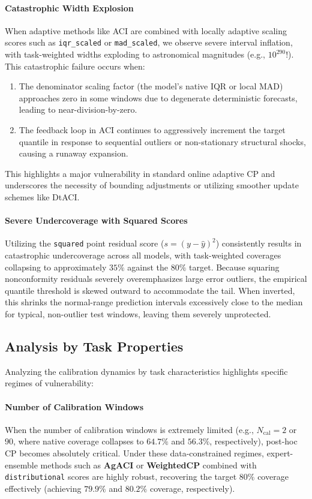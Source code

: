 \documentclass[12pt, a4paper]{article}
\begin{document}
\paragraph{Catastrophic Width Explosion}
When adaptive methods like ACI are combined with locally adaptive scaling scores such as \texttt{iqr\_scaled} or \texttt{mad\_scaled}, we observe severe interval inflation, with task-weighted widths exploding to astronomical magnitudes (e.g., \(10^{290}\)!). This catastrophic failure occurs when:
\begin{enumerate}
	\item The denominator scaling factor (the model's native IQR or local MAD) approaches zero in some windows due to degenerate deterministic forecasts, leading to near-division-by-zero.
	\item The feedback loop in ACI continues to aggressively increment the target quantile in response to sequential outliers or non-stationary structural shocks, causing a runaway expansion.
\end{enumerate}
This highlights a major vulnerability in standard online adaptive CP and underscores the necessity of bounding adjustments or utilizing smoother update schemes like DtACI.

\paragraph{Severe Undercoverage with Squared Scores}
Utilizing the \texttt{squared} point residual score (\(s = (y - \hat{y})^2\)) consistently results in catastrophic undercoverage across all models, with task-weighted coverages collapsing to approximately \(35\%\) against the \(80\%\) target. Because squaring nonconformity residuals severely overemphasizes large error outliers, the empirical quantile threshold is skewed outward to accommodate the tail. When inverted, this shrinks the normal-range prediction intervals excessively close to the median for typical, non-outlier test windows, leaving them severely unprotected.

\subsection{Analysis by Task Properties}
Analyzing the calibration dynamics by task characteristics highlights specific regimes of vulnerability:
\paragraph{Number of Calibration Windows}
When the number of calibration windows is extremely limited (e.g., \(N_{\text{cal}} = 2\) or \(90\), where native coverage collapses to \(64.7\%\) and \(56.3\%\), respectively), post-hoc CP becomes absolutely critical. Under these data-constrained regimes, expert-ensemble methods such as \textbf{AgACI} or \textbf{WeightedCP} combined with \texttt{distributional} scores are highly robust, recovering the target \(80\%\) coverage effectively (achieving \(79.9\%\) and \(80.2\%\) coverage, respectively).
\end{document}
